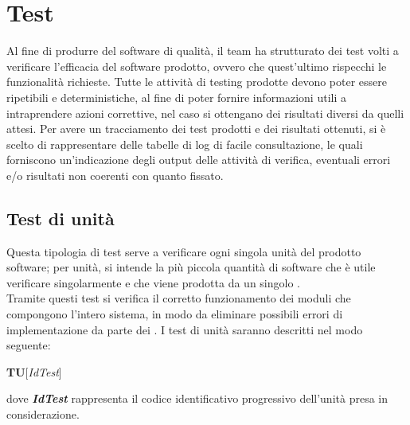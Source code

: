 \newpage
\section{Test}
Al fine di produrre del software di qualità, il team ha strutturato dei test volti a verificare l'efficacia del software prodotto, ovvero che quest'ultimo rispecchi le funzionalità richieste.
Tutte le attività di testing prodotte devono poter essere ripetibili e deterministiche, al fine di poter fornire informazioni utili a intraprendere azioni correttive, nel caso si ottengano dei risultati diversi da quelli attesi.
Per avere un tracciamento dei test prodotti e dei risultati ottenuti, si è scelto di rappresentare delle tabelle di log di facile consultazione, le quali forniscono un'indicazione degli output delle attività di verifica, eventuali errori e/o risultati non coerenti con quanto fissato.

	\subsection{Test di unità}
	Questa tipologia di test serve a verificare ogni singola unità del prodotto software; per unità, si intende la più piccola quantità di software che è utile verificare singolarmente e che viene prodotta da un singolo \textit{\Progr}.\\
	Tramite questi test si verifica il corretto funzionamento dei moduli che compongono l'intero sistema, in modo da eliminare possibili errori di implementazione da parte dei \textit{\Progrs}.
	I test di unità saranno descritti nel modo seguente:
	\begin{center}
		\textbf{TU}[\textit{IdTest}]
	\end{center}
	\begin{center}
		dove \textbf{\textit{IdTest}} rappresenta il codice identificativo progressivo dell'unità presa in considerazione.
	\end{center}
	
